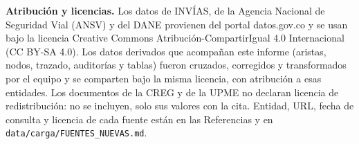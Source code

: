 \documentclass[12pt,a4paper]{article}
\begin{document}
\renewcommand{\refname}{Referencias}

{\footnotesize\noindent\textbf{Atribución y licencias.} Los datos de INVÍAS, de la
Agencia Nacional de Seguridad Vial (ANSV) y del DANE provienen del portal
datos.gov.co y se usan bajo la licencia Creative Commons
Atribución-CompartirIgual 4.0 Internacional (CC BY-SA 4.0). Los datos
derivados que acompañan este informe (aristas, nodos, trazado, auditorías y
tablas) fueron cruzados, corregidos y transformados por el equipo y se
comparten bajo la misma licencia, con atribución a esas entidades. Los
documentos de la CREG y de la UPME no declaran licencia de redistribución: no
se incluyen, solo sus valores con la cita. Entidad, URL, fecha de consulta y
licencia de cada fuente están en las Referencias y en
\nolinkurl{data/carga/FUENTES_NUEVAS.md}.\par}
\end{document}
